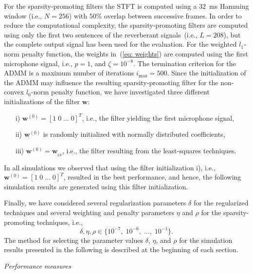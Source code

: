 \documentclass[10pt]{IEEEtran}
\begin{document}
For the sparsity-promoting filters the STFT is computed using a $32$~ms Hamming window (i.e., $N = 256$) with $50$\% overlap between successive frames.
In order to reduce the computational complexity, the sparsity-promoting filters are computed using only the first two sentences of the reverberant signals~(i.e., $L = 208$), but the complete output signal has been used for the evaluation.
For the weighted $l_1$-norm penalty function, the weights in~(\ref{eq: weights}) are computed using the first microphone signal, i.e., $p=1$, and $\zeta = 10^{-8}$.
The termination criterion for the ADMM is a maximum number of iterations $i_{\max} = 500$.
Since the initialization of the ADMM may influence the resulting sparsity-promoting filter for the non-convex $l_0$-norm penalty function, we have investigated three different initializations of the filter $\mathbf{w}$: 
\begin{itemize}
\item[i)] $\mathbf{w}^{(0)} = [1 \; 0 \; \ldots \; 0]^T$, i.e., the filter yielding the first microphone signal,
\item[ii)] $\mathbf{w}^{(0)}$ is randomly initialized with normally distributed coefficients, 
\item[iii)] $\mathbf{w}^{(0)} = \mathbf{w}_{_{\text{LS}}}$, i.e., the filter resulting from the least-squares techniques.
\end{itemize}
In all simulations we observed that using the filter initialization i), i.e., $\mathbf{w}^{(0)} = [1 \; 0 \; \ldots \; 0]^T$, resulted in the best performance, and hence, the following simulation results are generated using this filter initialization. 

Finally, we have considered several regularization parameters $\delta$ for the regularized techniques and several weighting and penalty parameters $\eta$ and $\rho$ for the sparsity-promoting techniques, i.e.,
\begin{equation}
\label{eq: pars}
\delta, \eta, \rho \in \{10^{-7}, \; 10^{-6}, \; \ldots, \; 10^{-1} \}.
\end{equation}
The method for selecting the parameter values $\delta$, $\eta$, and $\rho$ for the simulation results presented in the following is described at the beginning of each section.

\vskip 5pt
\textit{Performance measures} 
\vskip 5pt
\end{document}
